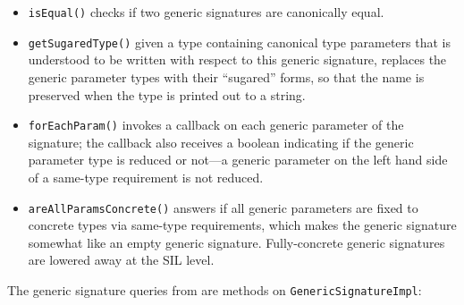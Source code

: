 \documentclass[../generics]{subfiles}
\begin{document}
\begin{itemize}
\item \texttt{isEqual()} checks if two generic signatures are canonically equal.
\item \texttt{getSugaredType()} given a type containing canonical type parameters that is understood to be written with respect to this generic signature, replaces the generic parameter types with their ``sugared'' forms, so that the name is preserved when the type is printed out to a string.
\item \texttt{forEachParam()} invokes a callback on each generic parameter of the signature; the callback also receives a boolean indicating if the generic parameter type is reduced or not---a generic parameter on the left hand side of a same-type requirement is not reduced.
\item \texttt{areAllParamsConcrete()} answers if all generic parameters are fixed to concrete types via same-type requirements, which makes the generic signature somewhat like an empty generic signature. Fully-concrete generic signatures are lowered away at the SIL level.
\end{itemize}
The generic signature queries from  are methods on \texttt{GenericSignatureImpl}:
\end{document}
